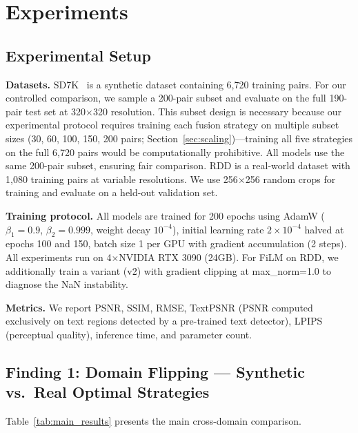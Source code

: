 \documentclass[pdflatex,sn-basic,Numbered]{sn-jnl}
\theoremstyle{thmstyleone}
\theoremstyle{thmstyletwo}
\theoremstyle{thmstylethree}
\begin{document}
\section{Experiments}\label{sec:experiments}

\subsection{Experimental Setup}\label{sec:setup}

\textbf{Datasets.}
SD7K~\cite{li2023single} is a synthetic dataset containing 6,720 training pairs. For our controlled comparison, we sample a 200-pair subset and evaluate on the full 190-pair test set at 320$\times$320 resolution. This subset design is necessary because our experimental protocol requires training each fusion strategy on multiple subset sizes (30, 60, 100, 150, 200 pairs; Section~\ref{sec:scaling})---training all five strategies on the full 6,720 pairs would be computationally prohibitive. All models use the same 200-pair subset, ensuring fair comparison.
RDD is a real-world dataset with 1,080 training pairs at variable resolutions. We use 256$\times$256 random crops for training and evaluate on a held-out validation set.

\textbf{Training protocol.}
All models are trained for 200 epochs using AdamW ($\beta_1=0.9$, $\beta_2=0.999$, weight decay $10^{-4}$), initial learning rate $2\times10^{-4}$ halved at epochs 100 and 150, batch size 1 per GPU with gradient accumulation (2 steps).
All experiments run on 4$\times$NVIDIA RTX 3090 (24GB).
For FiLM on RDD, we additionally train a variant (v2) with gradient clipping at max\_norm=1.0 to diagnose the NaN instability.

\textbf{Metrics.}
We report PSNR, SSIM, RMSE, TextPSNR (PSNR computed exclusively on text regions detected by a pre-trained text detector), LPIPS~\cite{zhang2018lpips} (perceptual quality), inference time, and parameter count.

\subsection{Finding 1: Domain Flipping --- Synthetic vs.\ Real Optimal Strategies}\label{sec:main_results}

Table~\ref{tab:main_results} presents the main cross-domain comparison.
\end{document}
